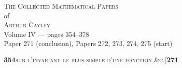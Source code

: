 \documentclass[11pt]{article}
\begin{document}
\thispagestyle{empty}
\begin{center}
\vspace*{2cm}
{\Large\scshape The Collected Mathematical Papers}\\[0.4em]
{\large of}\\[0.4em]
{\Large\scshape Arthur Cayley}\\[1.5em]
{\large Volume IV --- pages 354--378}\\[0.6em]
{\normalsize Paper 271 (conclusion), Papers 272, 273, 274, 275 (start)}\\[2em]
\vfill
\end{center}
\newpage

\setcounter{page}{354}


\noindent\textbf{354}\hfill\textsc{sur l'invariant le plus simple d'une fonction \&c.}\hfill\textbf{[271}

\medskip
\end{document}
